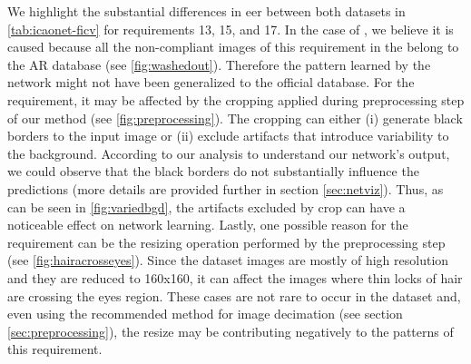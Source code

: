 We highlight the substantial differences in \acs{eer} between both datasets in \autoref{tab:icaonet-ficv} for requirements 13, 15, and 17. In the case of \washedout, we believe it is caused because all the non-compliant images of this requirement in the \ficvtest belong to the AR database (see \autoref{fig:washedout}). Therefore the pattern learned by the network might not have been generalized to the official database. For the \variedbackground requirement, it may be affected by the cropping applied during preprocessing step of our method (see \autoref{fig:preprocessing}). The cropping can either (i) generate black borders to the input image or (ii) exclude artifacts that introduce variability to the background. According to our analysis to understand our network's output, we could observe that the black borders do not substantially influence the predictions (more details are provided further in section \ref{sec:netviz}). Thus, as can be seen in \autoref{fig:variedbgd}, the artifacts excluded by crop can have a noticeable effect on network learning. Lastly, one possible reason for the \hairacrosseyes requirement can be the resizing operation performed by the preprocessing step (see \autoref{fig:hairacrosseyes}). Since the \adhoc dataset images are mostly of high resolution and they are reduced to 160x160, it can affect the images where thin locks of hair are crossing the eyes region. These cases are not rare to occur in the dataset and, even using the recommended method for image decimation (see section \ref{sec:preprocessing}), the resize may be contributing negatively to the patterns of this requirement. 

